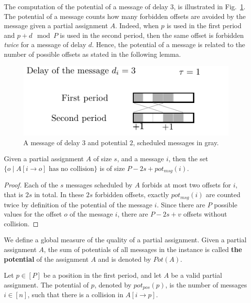\documentclass[a4paper,UKenglish,cleveref, autoref, thm-restate]{lipics-v2019}
\begin{document}
The computation of the potential of a message of delay $3$, is illustrated in Fig.~\ref{fig:messagepotential}. The potential of a message counts how many forbidden offsets are avoided by the message given a partial assignment $A$.
Indeed, when $p$ is used in the first period and $p+d \mod P$ is used in the second period,
then the same offset is forbidden \emph{twice} for a message of delay $d$. Hence, the potential of a message is related to the number of possible offsets as stated in the following lemma. 
\begin{figure}
\begin{center}
\includegraphics[scale=1]{messagepotential}
\end{center}
\caption{A message of delay $3$ and potential $2$, scheduled messages in gray.}
\label{fig:messagepotential}
\end{figure}

\begin{lemma}
Given a partial assignment $A$ of size $s$, and a message $i$, then the set $\{o \mid A[i \rightarrow o] \text{ has no collision}\}$ is of size $P - 2s + pot_{msg}(i)$.
\end{lemma}
\begin{proof}
 Each of the $s$ messages scheduled by $A$ forbids at most two offsets for $i$, that is $2s$ in total. In these $2s$ forbidden offsets, exactly $pot_{msg}(i)$ are counted twice by definition of the potential of the message $i$. Since there are $P$ possible values for the offset $o$ of the message $i$, there are $P - 2s + v$ offsets without collision.
\end{proof}

We define a global measure of the quality of a partial assignment. 
Given a partial assignment $A$, the sum of potentials of all messages in the instance is called \textbf{the potential} of the assignment $A$ and is denoted by $Pot(A)$. 


\begin{definition}
Let $p \in [P]$ be a position in the first period, and let $A$ be a valid partial assignment. The potential of $p$, denoted by $pot_{pos}(p)$, is the number of messages $i \in [n]$, such that there is a collision in $A[i \rightarrow p]$. 
\end{definition}
\end{document}
